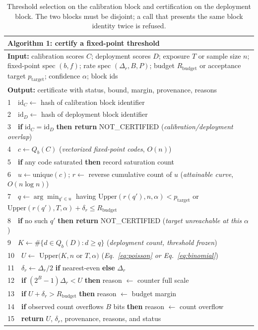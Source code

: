 \documentclass[preprint,12pt]{elsarticle}
\begin{document}
\begin{table}[t]
\centering\small
\caption{Threshold selection on the calibration block and certification on the
deployment block.  The two blocks must be disjoint; a call that presents the
same block identity twice is refused.}
\label{alg:certify}
\begin{tabular}{@{}p{}@{}}
\toprule
\textbf{Algorithm 1:} certify a fixed-point threshold \\
\midrule
\textbf{Input:} calibration scores $C$; deployment scores $D$; exposure $T$ or
sample size $n$; fixed-point spec $(b,f)$; rate spec $(\Delta_r,B,P)$; budget
$R_\mathrm{budget}$ or acceptance target $p_\mathrm{target}$; confidence
$\alpha$; block ids \\
\textbf{Output:} certificate with status, bound, margin, provenance, reasons \\
\midrule
1\ \ $\mathrm{id}_C \gets$ hash of calibration block identifier \\
2\ \ $\mathrm{id}_D \gets$ hash of deployment block identifier \\
3\ \ \textbf{if} $\mathrm{id}_C = \mathrm{id}_D$ \textbf{then return}
NOT\_CERTIFIED (\textit{calibration/deployment overlap}) \\
4\ \ $c \gets Q_b(C)$ \quad (\textit{vectorized fixed-point codes}, $O(n)$) \\
5\ \ \textbf{if} any code saturated \textbf{then} record saturation count \\
6\ \ $u \gets \mathrm{unique}(c)$; $r \gets$ reverse cumulative count of $u$
\quad (\textit{attainable curve}, $O(n\log n)$) \\
7\ \ $q \gets \arg\min_{q'\in u}$ having
$\mathrm{Upper}(r(q'),n,\alpha) < p_\mathrm{target}$ or
$\mathrm{Upper}(r(q'),T,\alpha)+\delta_r \le R_\mathrm{budget}$ \\
8\ \ \textbf{if} no such $q'$ \textbf{then return} NOT\_CERTIFIED
(\textit{target unreachable at this $\alpha$}) \\
9\ \ $K \gets \#\{d \in Q_b(D) : d \ge q\}$
\quad (\textit{deployment count, threshold frozen}) \\
10\ \ $U \gets$ Upper$(K, n$ or $T, \alpha)$
\quad (\textit{Eq.~\eqref{eq:poisson} or Eq.~\eqref{eq:binomial}}) \\
11\ \ $\delta_r \gets \Delta_r/2$ \textbf{if} nearest-even \textbf{else}
$\Delta_r$ \\
12\ \ \textbf{if} $(2^B-1)\Delta_r < U$ \textbf{then} reason $\gets$ counter
full scale \\
13\ \ \textbf{if} $U+\delta_r > R_\mathrm{budget}$ \textbf{then} reason $\gets$
budget margin \\
14\ \ \textbf{if} observed count overflows $B$ bits \textbf{then} reason $\gets$
count overflow \\
15\ \ \textbf{return} $U$, $\delta_r$, provenance, reasons, and status \\
\bottomrule
\end{tabular}
\end{table}
\end{document}

